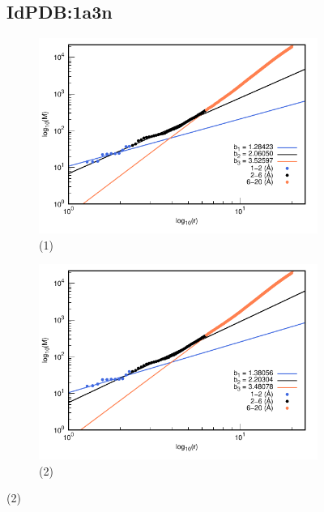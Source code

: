 \begin{figure}[H]
	\subsection*{IdPDB:1a3n}
	
	\hspace{-0.3cm} 
	\begin{subfigure}{0.49\textwidth}
		\centering
		\includegraphics[width=\linewidth,page=1]{graphs/PDBs/1a3n/1a3naddH.pdf}
		\caption{(1)}
	\end{subfigure}
	\hspace{0.2cm}
	\begin{subfigure}{0.49\textwidth}
		\centering
		\includegraphics[width=\linewidth,page=1]{graphs/PDBs/1a3n/1a3nEm.pdf}
		\caption{(2)}
	\end{subfigure}
	

\end{figure}
